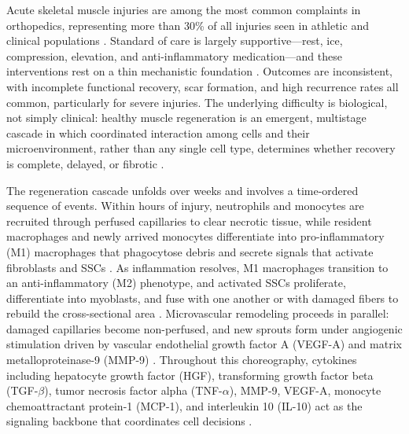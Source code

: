 \documentclass[10pt,letterpaper]{article}
\begin{document}
Acute skeletal muscle injuries are among the most common complaints in orthopedics, representing more than 30\% of all injuries seen in athletic and clinical populations \cite{maffulli2014muscle}. Standard of care is largely supportive---rest, ice, compression, elevation, and anti-inflammatory medication---and these interventions rest on a thin mechanistic foundation \cite{deyhle2018role}. Outcomes are inconsistent, with incomplete functional recovery, scar formation, and high recurrence rates all common, particularly for severe injuries. The underlying difficulty is biological, not simply clinical: healthy muscle regeneration is an emergent, multistage cascade in which coordinated interaction among cells and their microenvironment, rather than any single cell type, determines whether recovery is complete, delayed, or fibrotic \cite{forcina2020mechanisms,chazaud2020inflammation}.

The regeneration cascade unfolds over weeks and involves a time-ordered sequence of events. Within hours of injury, neutrophils and monocytes are recruited through perfused capillaries to clear necrotic tissue, while resident macrophages and newly arrived monocytes differentiate into pro-inflammatory (M1) macrophages that phagocytose debris and secrete signals that activate fibroblasts and SSCs \cite{tidball2017regulation,dumont2015satellite}. As inflammation resolves, M1 macrophages transition to an anti-inflammatory (M2) phenotype, and activated SSCs proliferate, differentiate into myoblasts, and fuse with one another or with damaged fibers to rebuild the cross-sectional area \cite{arnold2007inflammatory,bentzinger2013cellular}. Microvascular remodeling proceeds in parallel: damaged capillaries become non-perfused, and new sprouts form under angiogenic stimulation driven by vascular endothelial growth factor A (VEGF-A) and matrix metalloproteinase-9 (MMP-9) \cite{carmeliet2003angiogenesis}. Throughout this choreography, cytokines including hepatocyte growth factor (HGF), transforming growth factor beta (TGF-$\beta$), tumor necrosis factor alpha (TNF-$\alpha$), MMP-9, VEGF-A, monocyte chemoattractant protein-1 (MCP-1), and interleukin 10 (IL-10) act as the signaling backbone that coordinates cell decisions \cite{tatsumi1998hgf,lu2011macrophages}.
\end{document}
